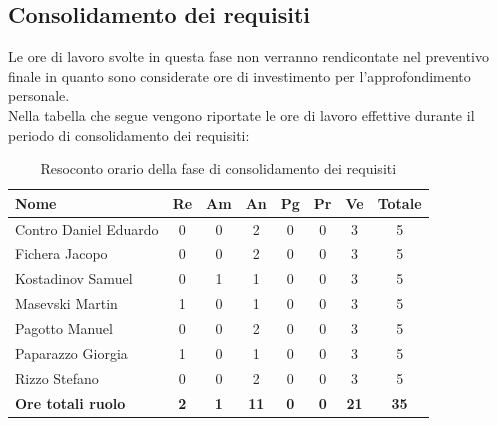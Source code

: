 \documentclass[../piano_di_progetto.tex]{subfiles}
\begin{document}
\subsection{Consolidamento dei requisiti}%
\label{sub:cons_cons_req}
Le ore di lavoro svolte in questa fase non verranno rendicontate nel preventivo finale in quanto sono considerate ore di investimento per l'approfondimento personale.\\
Nella tabella che segue vengono riportate le ore di lavoro effettive durante il periodo di consolidamento dei requisiti: \\

\begin{table}[H]
	\centering
	\begin{tabular}{|l|c|c|c|c|c|c|c|}
	\hline
	\rowcolor{lightgray}
	\textbf{Nome} & \textbf{Re} & \textbf{Am} & \textbf{An} & \textbf{Pg}  & \textbf{Pr}   & \textbf{Ve} & \textbf{Totale}\\
	\hline
	Contro Daniel Eduardo & 0 & 0 & 2 & 0 & 0 & 3 & 5 \\
	Fichera Jacopo & 0 & 0 & 2 & 0 & 0 & 3 & 5 \\
	Kostadinov Samuel & 0 & 1 & 1 & 0 & 0 & 3 & 5 \\			
	Masevski Martin & 1 & 0 & 1 & 0 & 0 & 3 & 5 \\
	Pagotto Manuel & 0 & 0 & 2 & 0 & 0 & 3 & 5 \\			
	Paparazzo Giorgia & 1 & 0 & 1 & 0 & 0 & 3 & 5 \\
	Rizzo Stefano & 0 & 0 & 2 & 0 & 0 & 3 & 5 \\
	\hline
	\textbf{Ore totali ruolo} & \textbf{2} & \textbf{1} & \textbf{11} & \textbf{0} & \textbf{0} & \textbf{21} & \textbf{35} \\
	\hline
	\end{tabular}
	\caption{Resoconto orario della fase di consolidamento dei requisiti}
\end{table}
\end{document}

